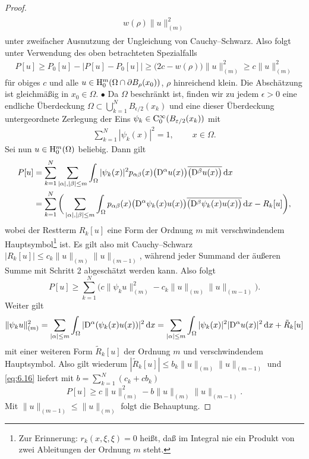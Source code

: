 \begin{proof}
\begin{align}
\begin{split}
	 w(\rho) \|u\|_{(m)}^2
\end{split}
\end{align}
unter zweifacher Ausnutzung der Ungleichung von Cauchy--Schwarz. Also folgt unter Verwendung des oben betrachteten Spezialfalls
\begin{align}
	P[u] \ge P_0[u] - \big| P[u] - P_0[u] \big| \ge \big( 2c - w(\rho) \big) \|u\|_{(m)}^2 \ge  c \| u\|_{(m)}^2
\end{align} 
für obiges $c$ und alle $u\in \mathrm H_0^m(\Omega \cap \partial B_\rho(x_0))$,  $\rho$ hinreichend klein. Die Abschätzung ist gleichmäßig in $x_0\in\Omega$.
$\bullet$ Da $\Omega$ beschränkt ist, finden wir zu jedem $\epsilon>0$ eine endliche Überdeckung $\Omega\subset\bigcup_{k=1}^N B_{{\epsilon}/{2}}(x_k)$ und eine dieser Überdeckung untergeordnete Zerlegung der Eins $\psi_k\in\mathrm C_0^\infty(B_{\varepsilon/2}(x_k))$ mit
\begin{align}
 \sum\limits_{k=1}^N |\psi_k(x)|^2 = 1,\qquad \ x\in \Omega.
\end{align}
Sei nun $u\in\mathrm H_0^m(\Omega)$ beliebig. Dann gilt
\begin{equation}
\begin{split}
	P[u]&= \sum_{k=1}^N \sum\limits_{|\alpha|,|\beta|\le m} \int_\Omega |\psi_k(x)|^2p_{\alpha\beta}(x)\big(\mathrm D^\alpha u(x)\big)\overline{\big(\mathrm D^\beta u(x)\big)}\,\mathrm d x\\
	&=  \sum_{k=1}^N \bigg( \sum\limits_{|\alpha|,|\beta|\le m} \int_\Omega  p_{\alpha\beta}(x)\big(\mathrm D^\alpha \psi_k(x) u(x)\big)\overline{\big(\mathrm D^\beta \psi_k(x) u(x)\big)}\,\mathrm d x
	- R_k[u]\bigg),
\end{split}
\end{equation}
wobei der Restterm $R_k[u]$ eine Form der Ordnung $m$ mit verschwindendem Hauptsymbol\footnote{Zur Erinnerung: $r_k(x,\xi,\xi)=0$ heißt, daß im Integral nie ein Produkt von zwei Ableitungen der Ordnung $m$ steht.} ist. Es gilt also mit Cauchy--Schwarz $|R_k[u]|\le c_k \|u\|_{(m)} \|u\|_{(m-1)}$, während jeder Summand der äußeren Summe mit Schritt 2 abgeschätzt werden kann. Also folgt 
\begin{equation}\label{eq:6.16}
P[u] \ge \sum_{k=1}^N  \bigg( c \|\psi_k u\|_{(m)}^2 - c_k \|u\|_{(m)} \|u\|_{(m-1)} \bigg) .
\end{equation}
Weiter gilt 
\begin{equation}
   \|\psi_k u\|_{(m)}^2 =  \sum_{|\alpha|\le m} \int_\Omega |\mathrm D^\alpha (\psi_k(x) u(x)) |^2 \,\mathrm d x
   =   \sum_{|\alpha|\le m} \int_\Omega  |\psi_k(x)|^2  |\mathrm D^\alpha u(x) |^2 \,\mathrm d x + \tilde R_k[u]
\end{equation}
mit einer weiteren Form $\tilde R_k[u]$  der Ordnung $m$ und verschwindendem Hauptsymbol. Also gilt wiederum $|\tilde R_k[u]|\le b_k \|u\|_{(m)}\|u\|_{(m-1)}$ und  \eqref{eq:6.16} liefert mit $b= \sum_{k=1}^N (c_k + c b_k  )$
\begin{equation}
P[u] \ge c \|u\|_{(m)}^2 - b \|u\|_{(m)}\|u\|_{(m-1)} .
\end{equation}
Mit $\|u\|_{(m-1)}\le \|u\|_{(m)}$ folgt die Behauptung.
\end{proof}



